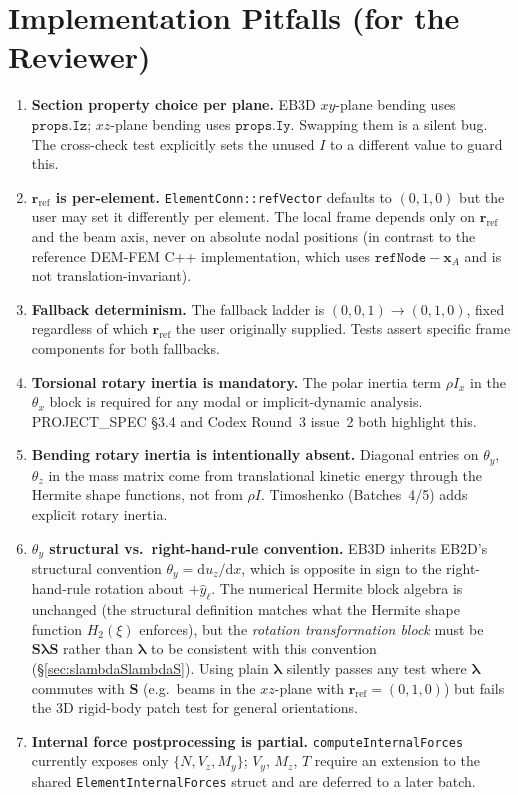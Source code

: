 \documentclass[11pt,a4paper]{article}
\newcommand{\dd}{\mathrm{d}}
\newcommand{\bmath}[1]{\boldsymbol{#1}}
\begin{document}
\section{Implementation Pitfalls (for the Reviewer)}

\begin{enumerate}
    \item \textbf{Section property choice per plane.} EB3D $xy$-plane bending uses $\texttt{props.Iz}$; $xz$-plane bending uses $\texttt{props.Iy}$. Swapping them is a silent bug. The cross-check test explicitly sets the unused $I$ to a different value to guard this.
    \item \textbf{$\bmath{r}_{\text{ref}}$ is per-element.} \texttt{ElementConn::refVector} defaults to $(0,1,0)$ but the user may set it differently per element. The local frame depends only on $\bmath{r}_{\text{ref}}$ and the beam axis, never on absolute nodal positions (in contrast to the reference DEM-FEM C++ implementation, which uses $\texttt{refNode} - \bmath{x}_A$ and is not translation-invariant).
    \item \textbf{Fallback determinism.} The fallback ladder is $(0,0,1) \to (0,1,0)$, fixed regardless of which $\bmath{r}_{\text{ref}}$ the user originally supplied. Tests assert specific frame components for both fallbacks.
    \item \textbf{Torsional rotary inertia is mandatory.} The polar inertia term $\rho I_x$ in the $\theta_x$ block is required for any modal or implicit-dynamic analysis. PROJECT\_SPEC \S3.4 and Codex Round~3 issue~2 both highlight this.
    \item \textbf{Bending rotary inertia is intentionally absent.} Diagonal entries on $\theta_y$, $\theta_z$ in the mass matrix come from translational kinetic energy through the Hermite shape functions, not from $\rho I$. Timoshenko (Batches~4/5) adds explicit rotary inertia.
    \item \textbf{$\theta_y$ structural vs.\ right-hand-rule convention.} EB3D inherits EB2D's structural convention $\theta_y = \dd u_z / \dd x$, which is opposite in sign to the right-hand-rule rotation about $+\hat{y}_\ell$. The numerical Hermite block algebra is unchanged (the structural definition matches what the Hermite shape function $H_2(\xi)$ enforces), but the \emph{rotation transformation block} must be $\bmath{S}\bmath{\lambda}\bmath{S}$ rather than $\bmath{\lambda}$ to be consistent with this convention (\S\ref{sec:slambdaSlambdaS}). Using plain $\bmath{\lambda}$ silently passes any test where $\bmath{\lambda}$ commutes with $\bmath{S}$ (e.g.\ beams in the $xz$-plane with $\bmath{r}_{\text{ref}}=(0,1,0)$) but fails the 3D rigid-body patch test for general orientations.
    \item \textbf{Internal force postprocessing is partial.} \texttt{computeInternalForces} currently exposes only $\{N, V_z, M_y\}$; $V_y$, $M_z$, $T$ require an extension to the shared \texttt{ElementInternalForces} struct and are deferred to a later batch.
\end{enumerate}
\end{document}
